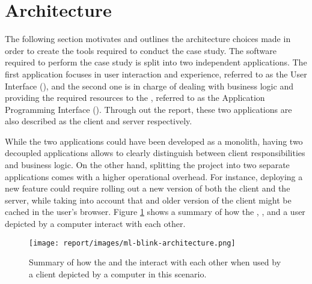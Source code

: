 \section{Architecture} \label{sect:case-study:arch}

The following section motivates and outlines the architecture choices made in order to create the tools required to conduct the case study. The software required to perform the case study is split into two independent applications. The first application focuses in user interaction and experience, referred to as the \mlblink User Interface (\mlblinkui), and the second one is in charge of dealing with business logic and providing the required resources to the \mlblinkui, referred to as the \mlblink Application Programming Interface (\mlblinkapi). Through out the report, these two applications are also described as the client and server respectively.  \newline

While the two applications could have been developed as a monolith, having two decoupled applications allows to clearly distinguish between client responsibilities and business logic. On the other hand, splitting the project into two separate applications comes with a higher operational overhead. For instance, deploying a new feature could require rolling out a new version of both the client and the server, while taking into account that and older version of the client might be cached in the user's browser. Figure \ref{fig:ml-blink-architecture} shows a summary of how the \mlblinkui, \mlblinkapi, and a user depicted by a computer interact with each other.

\begin{figure}[H]
  \centering
  \texttt{[image: report/images/ml-blink-architecture.png]}
  \caption{Summary of how the \mlblinkui and the \mlblinkapi interact with each other when used by a client depicted by a computer in this scenario.}
  \label{fig:ml-blink-architecture}
\end{figure}